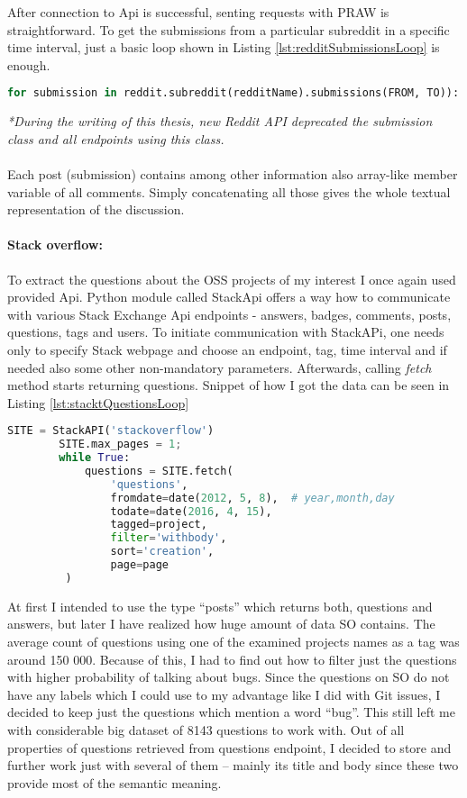 After connection to Api is successful, senting requests with PRAW is straightforward. To get the submissions from a particular subreddit in a specific time interval, just a basic loop shown in Listing \ref{lst:redditSubmissionsLoop} is enough.

\begin{lstlisting}[caption={Getting posts from subreddit *},label={lst:redditSubmissionsLoop},language=Python]
for submission in reddit.subreddit(redditName).submissions(FROM, TO)):
\end{lstlisting}
\textit{*During the writing of this thesis, new Reddit API deprecated the submission class and all endpoints using this class.}\\
\\
Each post (submission) contains among other information also array-like member variable of all comments. Simply concatenating all those gives the whole textual representation of the discussion.


\paragraph{Stack overflow:}
To extract the questions about the OSS projects of my interest I once again used provided Api. Python module called StackApi offers a way how to communicate with various Stack Exchange Api endpoints - answers, badges, comments, posts, questions, tags and users. To initiate communication with StackAPi, one needs only to specify Stack webpage and choose an endpoint, tag, time interval and if needed also some other non-mandatory parameters. Afterwards, calling \textit{fetch} method starts returning questions. Snippet of how I got the data can be seen in Listing \ref{lst:stacktQuestionsLoop}

\begin{lstlisting}[caption={Getting Stackoverflow questions with StackApi},label={lst:stacktQuestionsLoop},language=Python]
	SITE = StackAPI('stackoverflow')
    	SITE.max_pages = 1;
    	while True:
    		questions = SITE.fetch(
    			'questions',
    			fromdate=date(2012, 5, 8),  # year,month,day
        		todate=date(2016, 4, 15),
        		tagged=project,
        		filter='withbody',
        		sort='creation',
        		page=page
         )
\end{lstlisting}

At first I intended to use the type “posts” which returns both, questions and answers, but later I have realized how huge amount of data SO contains.  The average count of questions using one of the examined projects names as a tag was around 150 000. Because of this, I had to find out how to filter just the questions with higher probability of talking about bugs. Since the questions on SO do not have any labels which I could use to my advantage like I did with Git issues, I decided to keep just the questions which mention a word “bug”. This still left me with considerable big dataset of 8143 questions to work with. Out of all properties of questions retrieved from questions endpoint, I decided to store and further work just with several of them – mainly its title and body since these two provide most of the semantic meaning.